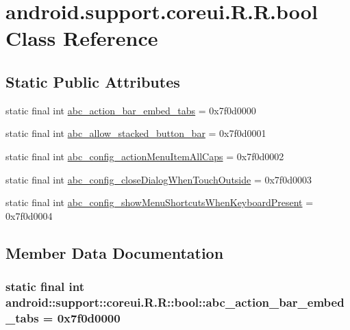 \hypertarget{classandroid_1_1support_1_1coreui_1_1_r_1_1bool}{
\section{android.support.coreui.R.R.bool Class Reference}
\label{classandroid_1_1support_1_1coreui_1_1_r_1_1bool}
}
\subsection*{Static Public Attributes}
\begin{CompactItemize}
\item 
static final int \hyperlink{classandroid_1_1support_1_1coreui_1_1_r_1_1bool_8c2ebf9a1166f95adb7be27fe7fcebab}{abc\_\-action\_\-bar\_\-embed\_\-tabs} = 0x7f0d0000
\item 
static final int \hyperlink{classandroid_1_1support_1_1coreui_1_1_r_1_1bool_3cb8154573a72a57144a985bd49f1369}{abc\_\-allow\_\-stacked\_\-button\_\-bar} = 0x7f0d0001
\item 
static final int \hyperlink{classandroid_1_1support_1_1coreui_1_1_r_1_1bool_7aac8206842f10865949a247fec08dc9}{abc\_\-config\_\-actionMenuItemAllCaps} = 0x7f0d0002
\item 
static final int \hyperlink{classandroid_1_1support_1_1coreui_1_1_r_1_1bool_dbdfd57fc01b275db1fca7e63489795d}{abc\_\-config\_\-closeDialogWhenTouchOutside} = 0x7f0d0003
\item 
static final int \hyperlink{classandroid_1_1support_1_1coreui_1_1_r_1_1bool_f4e6c7a6d50479547a2f3d753eb38c6a}{abc\_\-config\_\-showMenuShortcutsWhenKeyboardPresent} = 0x7f0d0004
\end{CompactItemize}


\subsection{Member Data Documentation}
\hypertarget{classandroid_1_1support_1_1coreui_1_1_r_1_1bool_8c2ebf9a1166f95adb7be27fe7fcebab}{
\subsubsection[{abc\_\-action\_\-bar\_\-embed\_\-tabs}]{\setlength{\rightskip}{0pt plus 5cm}static final int android::support::coreui.R.R::bool::abc\_\-action\_\-bar\_\-embed\_\-tabs = 0x7f0d0000}}
\label{classandroid_1_1support_1_1coreui_1_1_r_1_1bool_8c2ebf9a1166f95adb7be27fe7fcebab}


